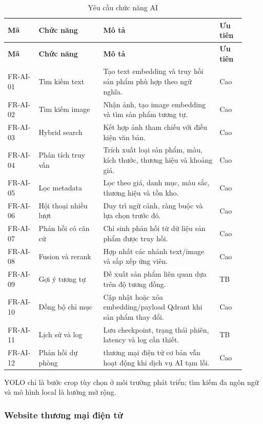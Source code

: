 \begin{longtable}{|p{0.12\linewidth}|p{0.25\linewidth}|p{0.45\linewidth}|p{0.10\linewidth}|}
\caption{Yêu cầu chức năng AI}\label{tab:ai-functional-requirements}\\
\hline
\textbf{Mã} & \textbf{Chức năng} & \textbf{Mô tả} & \textbf{Ưu tiên} \\
\hline
\endfirsthead
\hline
\textbf{Mã} & \textbf{Chức năng} & \textbf{Mô tả} & \textbf{Ưu tiên} \\
\hline
\endhead
FR-AI-01 & Tìm kiếm text & Tạo text embedding và truy hồi sản phẩm phù hợp theo ngữ nghĩa. & Cao \\
\hline
FR-AI-02 & Tìm kiếm image & Nhận ảnh, tạo image embedding và tìm sản phẩm tương tự. & Cao \\
\hline
FR-AI-03 & Hybrid search & Kết hợp ảnh tham chiếu với điều kiện văn bản. & Cao \\
\hline
FR-AI-04 & Phân tích truy vấn & Trích xuất loại sản phẩm, màu, kích thước, thương hiệu và khoảng giá. & Cao \\
\hline
FR-AI-05 & Lọc metadata & Lọc theo giá, danh mục, màu sắc, thương hiệu và tồn kho. & Cao \\
\hline
FR-AI-06 & Hội thoại nhiều lượt & Duy trì ngữ cảnh, ràng buộc và lựa chọn trước đó. & Cao \\
\hline
FR-AI-07 & Phản hồi có căn cứ & Chỉ sinh phản hồi từ dữ liệu sản phẩm được truy hồi. & Cao \\
\hline
FR-AI-08 & Fusion và rerank & Hợp nhất các nhánh text/image và sắp xếp ứng viên. & Cao \\
\hline
FR-AI-09 & Gợi ý tương tự & Đề xuất sản phẩm liên quan dựa trên độ tương đồng. & TB \\
\hline
FR-AI-10 & Đồng bộ chỉ mục & Cập nhật hoặc xóa embedding/payload Qdrant khi sản phẩm thay đổi. & Cao \\
\hline
FR-AI-11 & Lịch sử và log & Lưu checkpoint, trạng thái phiên, latency và log cần thiết. & TB \\
\hline
FR-AI-12 & Phản hồi dự phòng & thương mại điện tử cơ bản vẫn hoạt động khi dịch vụ AI tạm lỗi. & Cao \\
\hline
\end{longtable}

YOLO chỉ là bước crop tùy chọn ở môi trường phát triển; tìm kiếm đa ngôn ngữ và mô hình local là hướng mở rộng.

\subsubsection{Website thương mại điện tử}


